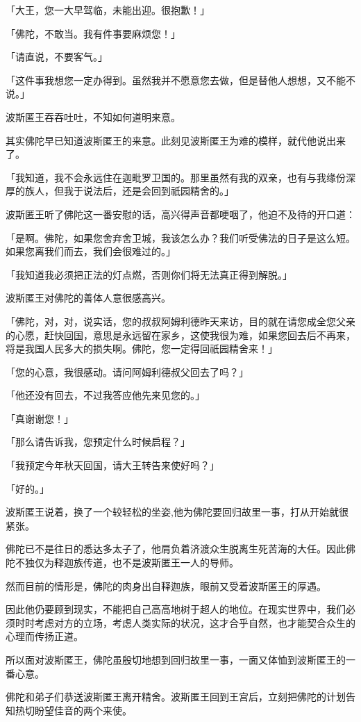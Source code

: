 \documentclass[twoside,openany]{book}
\begin{document}
「大王，您一大早驾临，未能出迎。很抱歉！」

「佛陀，不敢当。我有件事要麻烦您！」

「请直说，不要客气。」

「这件事我想您一定办得到。虽然我并不愿意您去做，但是替他人想想，又不能不说。」

波斯匿王吞吞吐吐，不知如何道明来意。

其实佛陀早已知道波斯匿王的来意。此刻见波斯匿王为难的模样，就代他说出来了。

「我知道，我不会永远住在迦毗罗卫国的。那里虽然有我的双亲，也有与我缘份深厚的族人，但我于说法后，还是会回到祇园精舍的。」

波斯匿王听了佛陀这一番安慰的话，高兴得声音都哽咽了，他迫不及待的开口道：

「是啊。佛陀，如果您舍弃舍卫城，我该怎么办？我们听受佛法的日子是这么短。如果您离我们而去，我们会很难过的。」

「我知道我必须把正法的灯点燃，否则你们将无法真正得到解脱。」

波斯匿王对佛陀的善体人意很感高兴。

「佛陀，对，对，说实话，您的叔叔阿姆利德昨天来访，目的就在请您成全您父亲的心愿，赶快回国，意思是永远留在家乡，这使我很为难，如果您回去后不再来，将是我国人民多大的损失啊。佛陀，您一定得回祇园精舍来！」

「您的心意，我很感动。请问阿姆利德叔父回去了吗？」

「他还没有回去，不过我答应他先来见您的。」

「真谢谢您！」

「那么请告诉我，您预定什么时候启程？」

「我预定今年秋天回国，请大王转告来使好吗？」

「好的。」

波斯匿王说着，换了一个较轻松的坐姿,他为佛陀要回归故里一事，打从开始就很紧张。

佛陀已不是往日的悉达多太子了，他肩负着济渡众生脱离生死苦海的大任。因此佛陀不独仅为释迦族传道，也不是波斯匿王一人的导师。

然而目前的情形是，佛陀的肉身出自释迦族，眼前又受着波斯匿王的厚遇。

因此他仍要顾到现实，不能把自己高高地树于超人的地位。在现实世界中，我们必须时时考虑对方的立场，考虑人类实际的状况，这才合乎自然，也才能契合众生的心理而传扬正道。

所以面对波斯匿王，佛陀虽殷切地想到回归故里一事，一面又体恤到波斯匿王的一番心意。

佛陀和弟子们恭送波斯匿王离开精舍。波斯匿王回到王宫后，立刻把佛陀的计划告知热切盼望佳音的两个来使。
\end{document}
